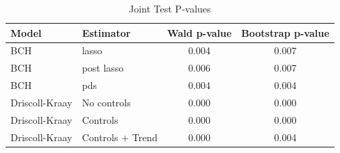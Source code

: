 \begin{table}[H]\centering
\caption{Joint Test P-values}
\begin{tabular}{llcc}
\toprule
Model & Estimator & Wald p-value & Bootstrap p-value \\
\midrule
BCH & lasso &     0.004 &     0.007 \\
BCH & post lasso &     0.006 &     0.007 \\
BCH & pds &     0.004 &     0.004 \\
Driscoll-Kraay & No controls &     0.000 &     0.000 \\
Driscoll-Kraay & Controls &     0.000 &     0.000 \\
Driscoll-Kraay & Controls + Trend &     0.000 &     0.004 \\
\bottomrule
\end{tabular}
\end{table}
